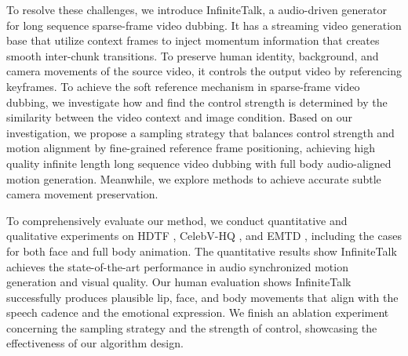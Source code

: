 

To resolve these challenges, we introduce InfiniteTalk, a audio-driven generator for long sequence sparse-frame video dubbing. It has a streaming video generation base that utilize context frames to inject momentum information that creates smooth inter-chunk transitions. To preserve human identity, background, and camera movements of the source video, it controls the output video by referencing keyframes. To achieve the soft reference mechanism in sparse-frame video dubbing, we investigate how and find the control strength is determined by the similarity between the video context and image condition. Based on our investigation, we propose a sampling strategy that balances control strength and motion alignment by fine-grained reference frame positioning, achieving high quality infinite length long sequence video dubbing with full body audio-aligned motion generation. Meanwhile, we explore methods to achieve accurate subtle camera movement preservation.

To comprehensively evaluate our method, we conduct quantitative and qualitative experiments on HDTF \cite{hdtf}, CelebV-HQ \cite{celebvhq}, and EMTD \cite{emtd}, including the cases for both face and full body animation. The quantitative results show InfiniteTalk achieves the state-of-the-art performance in audio synchronized motion generation and visual quality. Our human evaluation shows InfiniteTalk successfully produces plausible lip, face, and body movements that align with the speech cadence and the emotional expression. We finish an ablation experiment concerning the sampling strategy and the strength of control, showcasing the effectiveness of our algorithm design.

